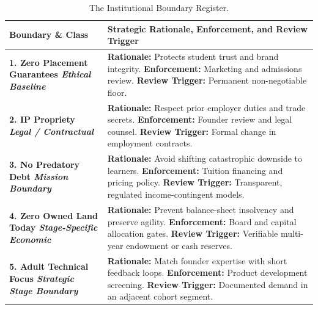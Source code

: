 \begin{table}[htbp]
\centering
\begin{tcolorbox}[
  enhanced,
  colback=white,
  colframe=BayesBorder!80!white,
  boxrule=0.4pt,
  arc=2pt,
  left=3pt,right=3pt,top=3pt,bottom=3pt,
  before skip=3pt,after skip=4pt
]
\scriptsize
\setlength{\tabcolsep}{3pt}
\renewcommand{\arraystretch}{1.18}
\begin{tabularx}{\linewidth}{@{} >{\bfseries\color{BayesInk}}p{2.3cm} >{\color{BayesInk}}X @{}}
\toprule
\textbf{Boundary \& Class} & \textbf{Strategic Rationale, Enforcement, and Review Trigger} \\
\midrule
1. Zero Placement Guarantees\newline
\textit{Ethical Baseline} & 
\textbf{Rationale:} Protects student trust and brand integrity.\newline
\textbf{Enforcement:} Marketing and admissions review.\newline
\textbf{Review Trigger:} Permanent non-negotiable floor. \\
\midrule
2. IP Propriety\newline
\textit{Legal / Contractual} & 
\textbf{Rationale:} Respect prior employer duties and trade secrets.\newline
\textbf{Enforcement:} Founder review and legal counsel.\newline
\textbf{Review Trigger:} Formal change in employment contracts. \\
\midrule
3. No Predatory Debt\newline
\textit{Mission Boundary} & 
\textbf{Rationale:} Avoid shifting catastrophic downside to learners.\newline
\textbf{Enforcement:} Tuition financing and pricing policy.\newline
\textbf{Review Trigger:} Transparent, regulated income-contingent models. \\
\midrule
4. Zero Owned Land Today\newline
\textit{Stage-Specific Economic} & 
\textbf{Rationale:} Prevent balance-sheet insolvency and preserve agility.\newline
\textbf{Enforcement:} Board and capital allocation gates.\newline
\textbf{Review Trigger:} Verifiable multi-year endowment or cash reserves. \\
\midrule
5. Adult Technical Focus\newline
\textit{Strategic Stage Boundary} & 
\textbf{Rationale:} Match founder expertise with short feedback loops.\newline
\textbf{Enforcement:} Product development screening.\newline
\textbf{Review Trigger:} Documented demand in an adjacent cohort segment. \\
\bottomrule
\end{tabularx}
\end{tcolorbox}
\caption{The Institutional Boundary Register.}
\label{tab:boundary-register}
\end{table}

